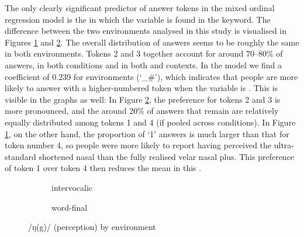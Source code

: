The only clearly significant predictor of answer tokens in the mixed ordinal regression model is the  in which the variable is found in the keyword.
The difference between the two environments analysed in this study is visualised in Figures \ref{fig.bar.ng.ext.intervoc} and \ref{fig.bar.ng.ext.wordfinal}.
The overall distribution of answers seems to be roughly the same in both environments.
Tokens 2 and 3 together account for around 70--80\% of answers, in both  conditions and in both  and  contexts.
In the model we find a coefficient of 0.239 for  environments (`\_\#'), which indicates that people are more likely to answer with a higher-numbered token when the variable is .
This is visible in the graphs as well: In Figure \ref{fig.bar.ng.ext.wordfinal}, the preference for tokens 2 and 3 is more pronounced, and the around 20\% of answers that remain are relatively equally distributed among tokens 1 and 4 (if pooled across  conditions).
In Figure \ref{fig.bar.ng.ext.intervoc}, on the other hand, the proportion of `1' answers is much larger than that for token number 4, so people were more likely to report having perceived the ultra-standard shortened nasal than the fully realised  velar nasal plus.
This preference of token 1 over token 4 then reduces the mean in this .

\begin{figure}[h]
	\centering
	\begin{subfigure}{0.49\textwidth}
		\centering
			\resizebox{\linewidth}{!}{}
		\caption{intervocalic}
		\label{fig.bar.ng.ext.intervoc}
	\end{subfigure}
	\begin{subfigure}{0.49\textwidth}
		\centering
			\resizebox{\linewidth}{!}{} 
		\caption{word-final}
		\label{fig.bar.ng.ext.wordfinal}
	\end{subfigure}
	\caption{/ŋ(g)/ (perception) by environment}
	\label{fig.bar.ng.ext.environment}
\end{figure}

